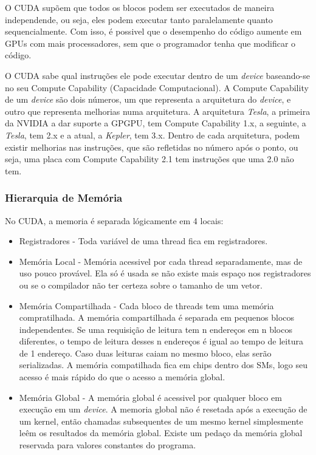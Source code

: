 O CUDA supõem que todos os blocos podem ser executados de maneira independende, ou seja, eles podem executar tanto paralelamente
quanto sequencialmente. Com isso, é possivel que o desempenho do código aumente em GPUs com mais processadores, sem que o programador
tenha que modificar o código.

O CUDA sabe qual instruções ele pode executar dentro de um \textit{device} baseando-se no seu Compute Capability 
(Capacidade Computacional). A Compute Capability de um \textit{device} são dois números, um que representa a arquitetura do 
\textit{device}, e outro que representa melhorias numa arquitetura.
A arquitetura \textit{Tesla}, a primeira da NVIDIA a dar suporte a GPGPU, tem Compute Capability 1.x, a seguinte, a \textit{Tesla},
tem 2.x e a atual, a \textit{Kepler}, tem 3.x. Dentro de cada arquitetura, podem existir melhorias nas instruções, que são
refletidas no número após o ponto, ou seja, uma placa com Compute Capability 2.1 tem instruções que uma 2.0 não tem.

\subsubsection{Hierarquia de Memória}
No CUDA, a memoria é separada lógicamente em 4 locais:

\begin{itemize}
  \item Registradores - Toda variável de uma thread fica em registradores.
  \item Memória Local - Memória acessivel por cada thread separadamente, mas de uso pouco provável. Ela só é usada se
          não existe mais espaço nos registradores ou se o compilador não ter certeza sobre o tamanho de um vetor.
  \item Memória Compartilhada - Cada bloco de threads tem uma memória compratilhada. A memória compartilhada é separada em
          pequenos blocos independentes. Se uma requisição de leitura tem n endereços em n blocos diferentes, o tempo de leitura
          desses n endereços é igual ao tempo de leitura de 1 endereço. Caso duas leituras caiam no mesmo bloco, elas serão
          serializadas. A memória compatilhada fica em chips dentro dos SMs, logo seu acesso é mais rápido do que o acesso a
          memória global.
  \item Memória Global - A memória global é acessivel por qualquer bloco em execução em um \textit{device}. A memoria global não é
          resetada após a execução de um kernel, então chamadas subsequentes de um mesmo kernel simplesmente leêm os resultados
          da memória global. Existe um pedaço da memória global reservada para valores constantes do programa.
\end{itemize}

